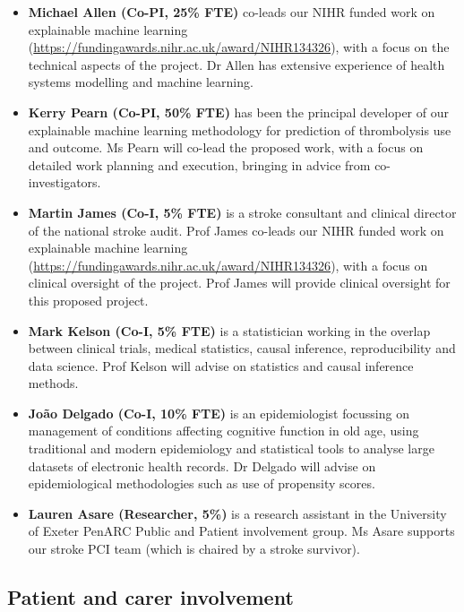 \begin{itemize}

    \item \textbf{Michael Allen (Co-PI, 25\% FTE)} co-leads our NIHR funded work on explainable machine learning (\url{https://fundingawards.nihr.ac.uk/award/NIHR134326}), with a focus on the technical aspects of the project. Dr Allen has extensive experience of health systems modelling and machine learning.

    \item \textbf{Kerry Pearn (Co-PI, 50\% FTE)} has been the principal developer of our explainable machine learning methodology for prediction of thrombolysis use and outcome. Ms Pearn will co-lead the proposed work, with a focus on detailed work planning and execution, bringing in advice from co-investigators.

    \item \textbf{Martin James (Co-I, 5\% FTE)} is a stroke consultant and clinical director of the national stroke audit. Prof James co-leads our NIHR funded work on explainable machine learning (\url{https://fundingawards.nihr.ac.uk/award/NIHR134326}), with a focus on clinical oversight of the project. Prof James will provide clinical oversight for this proposed project.

    \item \textbf{Mark Kelson (Co-I, 5\% FTE)} is a statistician working in the overlap between clinical trials, medical statistics, causal inference, reproducibility and data science. Prof Kelson will advise on statistics and causal inference methods.

    \item \textbf{João Delgado (Co-I, 10\% FTE)} is an epidemiologist focussing on management of conditions affecting cognitive function in old age, using traditional and modern epidemiology and statistical tools to analyse large datasets of electronic health records. Dr Delgado will advise on epidemiological methodologies such as use of propensity scores.

    \item \textbf{Lauren Asare (Researcher, 5\%)} is a research assistant in the University of Exeter PenARC Public and Patient involvement group. Ms Asare supports our stroke PCI team (which is chaired by a stroke survivor).

\end{itemize}

\subsection{Patient and carer involvement}

